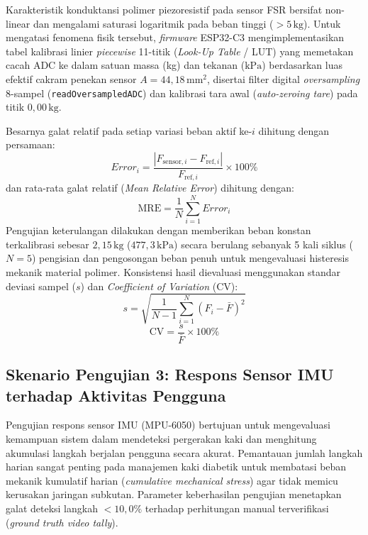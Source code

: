 Karakteristik konduktansi polimer piezoresistif pada sensor FSR bersifat non-linear dan mengalami saturasi logaritmik pada beban tinggi ($> 5\,\mathrm{kg}$). Untuk mengatasi fenomena fisik tersebut, \textit{firmware} ESP32-C3 mengimplementasikan tabel kalibrasi linier \textit{piecewise} 11-titik (\textit{Look-Up Table} / LUT) yang memetakan cacah ADC ke dalam satuan massa (kg) dan tekanan ($\mathrm{kPa}$) berdasarkan luas efektif cakram penekan sensor $A = 44{,}18\,\mathrm{mm}^2$, disertai filter digital \textit{oversampling} 8-sampel (\texttt{readOversampledADC}) dan kalibrasi tara awal (\textit{auto-zeroing tare}) pada titik $0{,}00\,\mathrm{kg}$.

Besarnya galat relatif pada setiap variasi beban aktif ke-$i$ dihitung dengan persamaan:
\begin{equation}
Error_i = \frac{\left|F_{\mathrm{sensor},i}-F_{\mathrm{ref},i}\right|}{F_{\mathrm{ref},i}} \times 100\%
\end{equation}
dan rata-rata galat relatif (\textit{Mean Relative Error}) dihitung dengan:
\begin{equation}
\mathrm{MRE} = \frac{1}{N}\sum_{i=1}^{N} Error_i
\end{equation}
Pengujian keterulangan dilakukan dengan memberikan beban konstan terkalibrasi sebesar $2{,}15\,\mathrm{kg}$ ($477{,}3\,\mathrm{kPa}$) secara berulang sebanyak 5 kali siklus ($N=5$) pengisian dan pengosongan beban penuh untuk mengevaluasi histeresis mekanik material polimer. Konsistensi hasil dievaluasi menggunakan standar deviasi sampel ($s$) dan \textit{Coefficient of Variation} (CV):
\begin{equation}
s = \sqrt{\frac{1}{N-1}\sum_{i=1}^{N}(F_i - \bar{F})^2}
\end{equation}
\begin{equation}
\mathrm{CV} = \frac{s}{\bar{F}} \times 100\%
\end{equation}

\subsection{Skenario Pengujian 3: Respons Sensor IMU terhadap Aktivitas Pengguna}
\label{subsec:Skenario3}

Pengujian respons sensor IMU (MPU-6050) bertujuan untuk mengevaluasi kemampuan sistem dalam mendeteksi pergerakan kaki dan menghitung akumulasi langkah berjalan pengguna secara akurat. Pemantauan jumlah langkah harian sangat penting pada manajemen kaki diabetik untuk membatasi beban mekanik kumulatif harian (\textit{cumulative mechanical stress}) agar tidak memicu kerusakan jaringan subkutan. Parameter keberhasilan pengujian menetapkan galat deteksi langkah $< 10{,}0\%$ terhadap perhitungan manual terverifikasi (\textit{ground truth video tally}).

